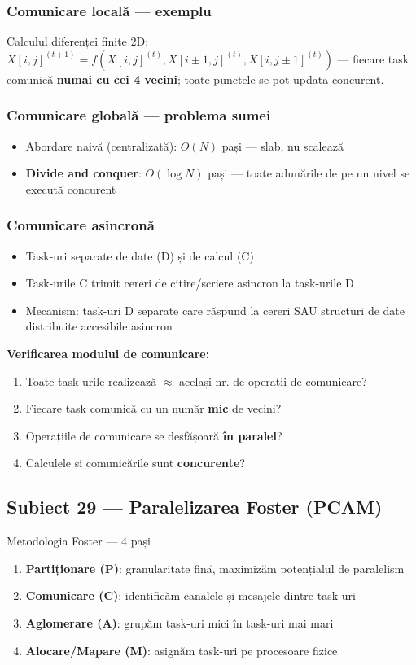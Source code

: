 \documentclass[a4paper,11pt]{article}
\newcommand{\subiect}[2]{\subsection{Subiect \textcolor{numcol}{#1} — #2}}
\begin{document}
\subsubsection{Comunicare locală — exemplu}
Calculul diferenței finite 2D: $X[i,j]^{(t+1)} = f(X[i,j]^{(t)}, X[i\pm1,j]^{(t)}, X[i,j\pm1]^{(t)})$
— fiecare task comunică \textbf{numai cu cei 4 vecini}; toate punctele se pot updata concurent.

\subsubsection{Comunicare globală — problema sumei}
\begin{itemize}[noitemsep]
  \item Abordare naivă (centralizată): $O(N)$ pași — slab, nu scalează
  \item \textbf{Divide and conquer}: $O(\log N)$ pași — toate adunările de pe un nivel se execută concurent
\end{itemize}

\subsubsection{Comunicare asincronă}
\begin{itemize}[noitemsep]
  \item Task-uri separate de date (D) și de calcul (C)
  \item Task-urile C trimit cereri de citire/scriere asincron la task-urile D
  \item Mecanism: task-uri D separate care răspund la cereri SAU structuri de date distribuite accesibile asincron
\end{itemize}

\textbf{Verificarea modului de comunicare:}
\begin{enumerate}[noitemsep]
  \item Toate task-urile realizează $\approx$ același nr. de operații de comunicare?
  \item Fiecare task comunică cu un număr \textbf{mic} de vecini?
  \item Operațiile de comunicare se desfășoară \textbf{în paralel}?
  \item Calculele și comunicările sunt \textbf{concurente}?
\end{enumerate}

\subiect{29}{Paralelizarea Foster (PCAM)}

\begin{defbox}{Metodologia Foster — 4 pași}
\begin{enumerate}[noitemsep]
  \item \textbf{Partiționare (P)}: granularitate fină, maximizăm potențialul de paralelism
  \item \textbf{Comunicare (C)}: identificăm canalele și mesajele dintre task-uri
  \item \textbf{Aglomerare (A)}: grupăm task-uri mici în task-uri mai mari
  \item \textbf{Alocare/Mapare (M)}: asignăm task-uri pe procesoare fizice
\end{enumerate}
\end{defbox}
\end{document}
